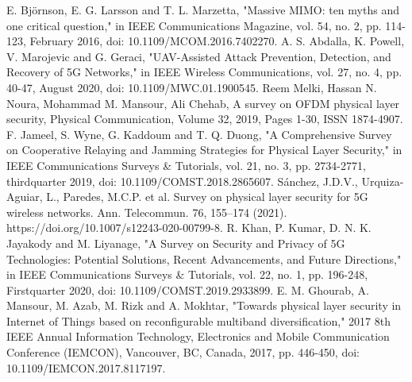 \documentclass[conference]{IEEEtran}
\begin{document}
\begin{thebibliography}{00}
E. Björnson, E. G. Larsson and T. L. Marzetta, "Massive MIMO: ten myths and one critical question," in IEEE Communications Magazine, vol. 54, no. 2, pp. 114-123, February 2016, doi: 10.1109/MCOM.2016.7402270. 
A. S. Abdalla, K. Powell, V. Marojevic and G. Geraci, "UAV-Assisted Attack Prevention, Detection, and Recovery of 5G Networks," in IEEE Wireless Communications, vol. 27, no. 4, pp. 40-47, August 2020, doi: 10.1109/MWC.01.1900545.
 Reem Melki, Hassan N. Noura, Mohammad M. Mansour, Ali Chehab,
A survey on OFDM physical layer security, Physical Communication, Volume 32, 2019, Pages 1-30, ISSN 1874-4907.
 F. Jameel, S. Wyne, G. Kaddoum and T. Q. Duong, "A Comprehensive Survey on Cooperative Relaying and Jamming Strategies for Physical Layer Security," in IEEE Communications Surveys & Tutorials, vol. 21, no. 3, pp. 2734-2771, thirdquarter 2019, doi: 10.1109/COMST.2018.2865607.
 Sánchez, J.D.V., Urquiza-Aguiar, L., Paredes, M.C.P. et al. Survey on physical layer security for 5G wireless networks. Ann. Telecommun. 76, 155–174 (2021). https://doi.org/10.1007/s12243-020-00799-8.
 R. Khan, P. Kumar, D. N. K. Jayakody and M. Liyanage, "A Survey on Security and Privacy of 5G Technologies: Potential Solutions, Recent Advancements, and Future Directions," in IEEE Communications Surveys & Tutorials, vol. 22, no. 1, pp. 196-248, Firstquarter 2020, doi: 10.1109/COMST.2019.2933899.
 E. M. Ghourab, A. Mansour, M. Azab, M. Rizk and A. Mokhtar, "Towards physical layer security in Internet of Things based on reconfigurable multiband diversification," 2017 8th IEEE Annual Information Technology, Electronics and Mobile Communication Conference (IEMCON), Vancouver, BC, Canada, 2017, pp. 446-450, doi: 10.1109/IEMCON.2017.8117197.
 \end{thebibliography}
\end{document}
